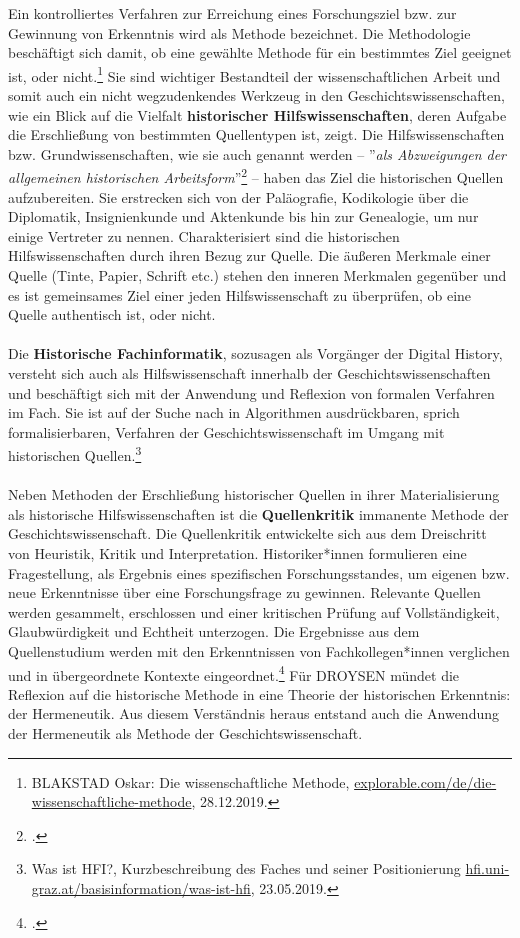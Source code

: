 \documentclass[12pt,a4paper]{article}
\begin{document}
Ein kontrolliertes Verfahren zur Erreichung eines Forschungsziel bzw. zur Gewinnung von Erkenntnis wird als Methode bezeichnet. Die Methodologie beschäftigt sich damit, ob eine gewählte Methode für ein bestimmtes Ziel geeignet ist, oder nicht.\footnote{BLAKSTAD Oskar: Die wissenschaftliche Methode, \url{explorable.com/de/die-wissenschaftliche-methode}, 28.12.2019.} Sie sind wichtiger Bestandteil der wissenschaftlichen Arbeit und somit auch ein nicht wegzudenkendes Werkzeug in den Geschichtswissenschaften, wie ein Blick auf die Vielfalt \textbf{historischer Hilfswissenschaften}, deren Aufgabe die Erschließung von bestimmten Quellentypen ist, zeigt. Die Hilfswissenschaften bzw. Grundwissenschaften, wie sie auch genannt werden -- ''\textit{als Abzweigungen der allgemeinen historischen Arbeitsform}''\footcite[][S.10]{von2007werkzeug} -- haben das Ziel die historischen Quellen aufzubereiten. Sie erstrecken sich von der Paläografie, Kodikologie über die Diplomatik, Insignienkunde und Aktenkunde bis hin zur Genealogie, um nur einige Vertreter zu nennen. Charakterisiert sind die historischen Hilfswissenschaften durch ihren Bezug zur Quelle. Die äußeren Merkmale einer Quelle (Tinte, Papier, Schrift etc.) stehen den inneren Merkmalen gegenüber und es ist gemeinsames Ziel einer jeden Hilfswissenschaft zu überprüfen, ob eine Quelle authentisch ist, oder nicht.
\\
\\
Die \textbf{Historische Fachinformatik}, sozusagen als Vorgänger der Digital History, versteht sich auch als Hilfswissenschaft innerhalb der Geschichtswissenschaften und beschäftigt sich mit der Anwendung und Reflexion von formalen Verfahren im Fach. Sie ist auf der Suche nach in Algorithmen ausdrückbaren, sprich formalisierbaren, Verfahren der Geschichtswissenschaft im Umgang mit historischen Quellen.\footnote{Was ist HFI?, Kurzbeschreibung des Faches und seiner Positionierung \protect\url{hfi.uni-graz.at/basisinformation/was-ist-hfi}, 23.05.2019.} 
\\
\\
Neben Methoden der Erschließung historischer Quellen in ihrer Materialisierung als historische Hilfswissenschaften ist die \textbf{Quellenkritik} immanente Methode der Geschichtswissenschaft. Die Quellenkritik entwickelte sich aus dem Dreischritt von Heuristik, Kritik und Interpretation. Historiker*innen formulieren eine Fragestellung, als Ergebnis eines spezifischen Forschungsstandes, um eigenen bzw. neue Erkenntnisse über eine Forschungsfrage zu gewinnen. Relevante Quellen werden gesammelt, erschlossen und einer kritischen Prüfung auf Vollständigkeit, Glaubwürdigkeit und Echtheit unterzogen. Die Ergebnisse aus dem Quellenstudium werden mit den Erkenntnissen von Fachkollegen*innen verglichen und in übergeordnete Kontexte eingeordnet.\footcite[][S.43-45]{jordan2018theorien} Für DROYSEN mündet die Reflexion auf die historische Methode in eine Theorie der historischen Erkenntnis: der Hermeneutik. Aus diesem Verständnis heraus entstand auch die Anwendung der Hermeneutik als Methode der Geschichtswissenschaft.
\end{document}
